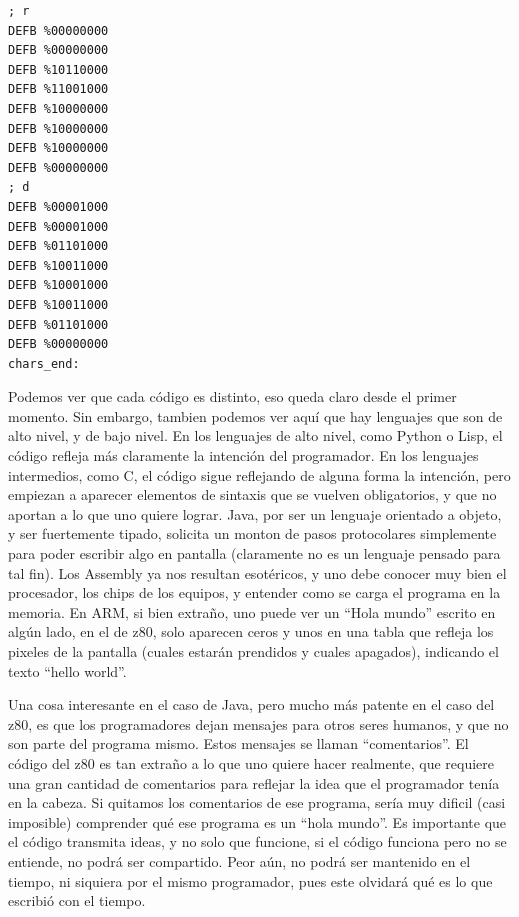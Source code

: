 \begin{lstlisting}[language={[x86masm]Assembler},morekeywords={LD,CLEAR,DJNZ,JR,HALT,DEFB}]
; r
DEFB %00000000
DEFB %00000000
DEFB %10110000
DEFB %11001000
DEFB %10000000
DEFB %10000000
DEFB %10000000
DEFB %00000000
; d
DEFB %00001000
DEFB %00001000
DEFB %01101000
DEFB %10011000
DEFB %10001000
DEFB %10011000
DEFB %01101000
DEFB %00000000
chars_end:
\end{lstlisting}

Podemos ver que cada código es distinto, eso queda claro desde el primer momento.
Sin embargo, tambien podemos ver aquí que hay lenguajes que son de alto nivel,
y de bajo nivel. En los lenguajes de alto nivel, como Python o Lisp, el código
refleja más claramente la intención del programador. En los lenguajes intermedios,
como C, el código sigue reflejando de alguna forma la intención, pero empiezan a
aparecer elementos de sintaxis que se vuelven obligatorios, y que no aportan a
lo que uno quiere lograr. Java, por ser un lenguaje orientado a objeto, y ser
fuertemente tipado, solicita un monton de pasos protocolares simplemente para
poder escribir algo en pantalla (claramente no es un lenguaje pensado para tal
fin). Los Assembly ya nos resultan esotéricos, y uno debe conocer muy bien el
procesador, los chips de los equipos, y entender como se carga el programa en
la memoria. En ARM, si bien extraño, uno puede ver un ``Hola mundo'' escrito
en algún lado, en el de z80, solo aparecen ceros y unos en una tabla que refleja
los pixeles de la pantalla (cuales estarán prendidos y cuales apagados), indicando
el texto ``hello world''.

Una cosa interesante en el caso de Java, pero mucho más patente en el caso del
z80, es que los programadores dejan mensajes para otros seres humanos, y que no
son parte del programa mismo. Estos mensajes se llaman ``comentarios''. El
código del z80 es tan extraño a lo que uno quiere hacer realmente, que requiere
una gran cantidad de comentarios para reflejar la idea que el programador tenía
en la cabeza. Si quitamos los comentarios de ese programa, sería muy dificil
(casi imposible) comprender qué ese programa es un ``hola mundo''. Es importante
que el código transmita ideas, y no solo que funcione, si el código funciona pero
no se entiende, no podrá ser compartido. Peor aún, no podrá ser mantenido en el
tiempo, ni siquiera por el mismo programador, pues este olvidará qué es lo que
escribió con el tiempo.
\vspace{1cm}

